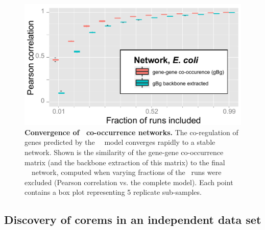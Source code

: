\begin{figure}[h!]
\centering
\includegraphics[width=0.75\linewidth]{figures/gBg_network_converge.pdf}
\caption[Convergence of \egrine\ gene co-occurrence networks.]  {
{\bf Convergence of \egrine\ co-occurrence networks.} The
co-regulation of genes predicted by the \eco\ \egrine\ model converges
rapidly to a stable network. Shown is the similarity of the gene-gene
co-occurrence matrix (and the backbone extraction of this matrix) to
the final \egrine\ \eco\ network, computed when varying fractions of
the \cm\ runs were excluded (Pearson correlation vs. the complete
model). Each point contains a box plot representing 5 replicate
sub-samples.}
\label{fig:gBg_network_converge}
\end{figure}

\subsection{Discovery of corems in an independent data set}

